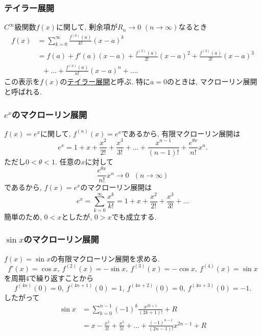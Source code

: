 \begin{frame}
\frametitle{テイラー展開}

\begin{Def}
$C^\infty$級関数$f(x)$に関して, 剰余項が$R_n \to 0$ $(n \rightarrow \infty)$なるとき
\begin{align*}
f(x) & = \sum_{k=0}^{\infty}\frac{f^{(k)}(a)}{k!}(x-a)^k \\
& =  f(a)+ f'(a)(x-a) + \frac{f^{(2)}(a)}{2!}(x-a)^2  + \frac{f^{(3)}(a)}{3!}(x-a)^3 \\
& \ \ \ + \dots + \frac{f^{(n)}(a)}{n!}(x-a)^{n}+\dots. 
\end{align*}
この表示を$f(x)$の\underline{テイラー展開}と呼ぶ. 
特に$a=0$のときは, マクローリン展開と呼ばれる. 
\end{Def}

\end{frame}






\begin{frame}
\frametitle{$e^x$のマクローリン展開}

$f(x)=e^x$に関して, $f^{(n)}(x)=e^x$であるから, 有限マクローリン展開は
$$
e^x=1+x+\frac{x^2}{2!}+\frac{x^3}{3!}+\dots+\frac{x^{n-1}}{(n-1)!}+\frac{e^{\theta x}}{n!}x^n. 
$$
ただし$0<\theta < 1$. 
任意の$x$に対して
$$
\frac{e^{\theta x}}{n!}x^n \to 0 \ \ \ (n \to \infty)
$$
であるから, $f(x)=e^x$のマクローリン展開は
$$
e^x= \sum_{k=0}^{\infty}\frac{x^k}{k!}
=1+x+\frac{x^2}{2!}+\frac{x^3}{3!}+\dots
$$
簡単のため, $0<x$としたが, $0>x$でも成立する.  
\end{frame}






\begin{frame}
\frametitle{$\sin x$のマクローリン展開}

$f(x)=\sin x$の有限マクローリン展開を求める. 
$$
f'(x)=\cos x, \ f^{(2)}(x)=-\sin x, \ f^{(3)}(x)=-\cos x, \ f^{(4)}(x)=\sin x
$$
を周期$4$で繰り返すことから
$$
 f^{(4n)}(0)=0, \ f^{(4n+1)}(0)=1, \ f^{(4n+2)}(0)=0, \ f^{(4n+3)}(0)=-1. 
$$
したがって
\begin{align*}
\sin x & = \sum_{k=0}^{n-1}(-1)^k\frac{x^{2k+1}}{(2k+1)!}+R \\
& = x-\frac{x^3}{3!}+\frac{x^5}{5!}+\dots+\frac{(-1)^{n-1}}{(2n-1)!}x^{2n-1}+R
\end{align*}
	

\end{frame}




